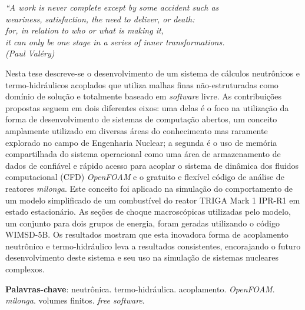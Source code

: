 \documentclass[12pt,openright,twoside,a4paper,english,french,spanish,brazil]{abntex2}
\begin{document}
\begin{epigrafe}
    \vspace*{\fill}
	\begin{flushright}
          \textit{``A work is never complete except by some accident such as\\
            weariness, satisfaction, the need to deliver, or death: \\
            for, in relation to who or what is making it, \\
            it can only be one stage in a series of inner transformations. \\
            (Paul Valéry)}
	\end{flushright}
\end{epigrafe}


\begin{resumo}

  Nesta tese descreve-se o desenvolvimento de um sistema de cálculos
  neutrônicos e termo-hidráulicos acoplados que utiliza malhas finas não-estruturadas
  como domínio de solução e totalmente baseado em \textit{software} livre.
  As contribuições propostas seguem em dois diferentes eixos: uma delas é o foco na utilização
  da forma de desenvolvimento de sistemas de computação abertos, um conceito amplamente
  utilizado em diversas áreas do conhecimento mas raramente explorado no campo de Engenharia Nuclear;
  a segunda é o uso de memória compartilhada do sistema operacional como uma área de armazenamento
  de dados de confiável e rápido acesso para acoplar o sistema de dinâmica dos fluidos computacional
  (CFD) \textit{OpenFOAM} e o gratuito e flexível código de análise de reatores \textit{milonga}.
  Este conceito foi aplicado na simulação do comportamento de um modelo simplificado de um combustível
  do reator TRIGA Mark 1 IPR-R1 em estado estacionário. As seções de choque macroscópicas utilizadas pelo
  modelo, um conjunto para dois grupos de energia, foram geradas utilizando o código WIMSD-5B.
  Os resultados mostram que esta inovadora forma de acoplamento neutrônico e termo-hidráulico leva
  a resultados consistentes,
  encorajando o futuro desenvolvimento deste sistema e seu uso na simulação de sistemas nucleares complexos.


 \vspace{\onelineskip}
    
 \noindent
 \textbf{Palavras-chave}: neutrônica. termo-hidráulica. acoplamento. \textit{OpenFOAM}. \textit{milonga}. volumes finitos. \textit{free software}.
\end{resumo}
\end{document}

